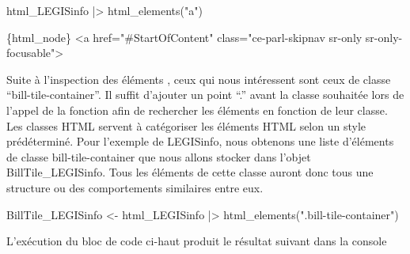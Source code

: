 \documentclass[
  letterpaper,
  DIV=11,
  numbers=noendperiod]{scrreprt}
\newenvironment{Shaded}{\begin{snugshade}}{\end{snugshade}}
\newcommand{\ExtensionTok}[1]{\textcolor[rgb]{0.00,0.23,0.31}{#1}}
\newcommand{\KeywordTok}[1]{\textcolor[rgb]{0.00,0.23,0.31}{#1}}
\newcommand{\NormalTok}[1]{\textcolor[rgb]{0.00,0.23,0.31}{#1}}
\newcommand{\OperatorTok}[1]{\textcolor[rgb]{0.37,0.37,0.37}{#1}}
\newcommand{\StringTok}[1]{\textcolor[rgb]{0.13,0.47,0.30}{#1}}
\newcommand{\VariableTok}[1]{\textcolor[rgb]{0.07,0.07,0.07}{#1}}
\begin{document}
\begin{Shaded}
\begin{Highlighting}[]
\ExtensionTok{html\_LEGISinfo} \KeywordTok{|}\OperatorTok{\textgreater{}}\NormalTok{ html\_elements}\KeywordTok{(}\StringTok{"a"}\KeywordTok{)}
\end{Highlighting}
\end{Shaded}

\begin{Shaded}
\begin{Highlighting}[]
\ExtensionTok{\{html\_node\}}
\OperatorTok{\textless{}}\NormalTok{a }\VariableTok{href}\OperatorTok{=}\StringTok{"\#StartOfContent"} \VariableTok{class}\OperatorTok{=}\StringTok{"ce{-}parl{-}skipnav sr{-}only sr{-}only{-}focusable"}\OperatorTok{\textgreater{}}
\end{Highlighting}
\end{Shaded}

Suite à l'inspection des éléments , ceux qui nous intéressent sont ceux
de classe ``bill-tile-container''. Il suffit d'ajouter un point ``.''
avant la classe souhaitée lors de l'appel de la fonction afin de
rechercher les éléments en fonction de leur classe. Les classes HTML
servent à catégoriser les éléments HTML selon un style prédéterminé.
Pour l'exemple de LEGISinfo, nous obtenons une liste d'éléments de
classe bill-tile-container que nous allons stocker dans l'objet
BillTile\_LEGISinfo. Tous les éléments de cette classe auront donc tous
une structure ou des comportements similaires entre eux.

\begin{Shaded}
\begin{Highlighting}[]
\ExtensionTok{BillTile\_LEGISinfo} \OperatorTok{\textless{}}\NormalTok{{-} html\_LEGISinfo }\KeywordTok{|}\OperatorTok{\textgreater{}}\NormalTok{ html\_elements}\KeywordTok{(}\StringTok{".bill{-}tile{-}container"}\KeywordTok{)}
\end{Highlighting}
\end{Shaded}

L'exécution du bloc de code ci-haut produit le résultat suivant dans la
console
\end{document}
